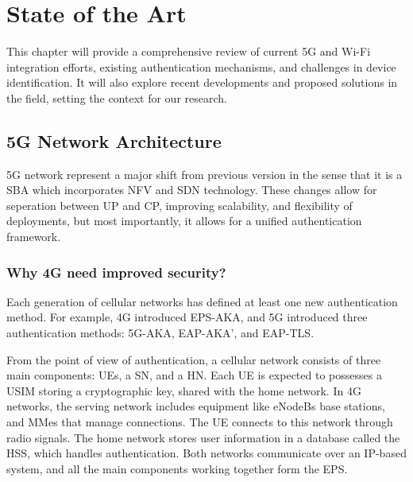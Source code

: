 \chapter{State of the Art}%
\label{chapter:State of the Art}

\begin{introduction}
This chapter will provide a comprehensive review of current \ac{5G} and Wi-Fi integration efforts, existing authentication mechanisms, and challenges in device identification. It will also explore recent developments and proposed solutions in the field, setting the context for our research.
\end{introduction}

\section{\acs{5G} Network Architecture}

\ac{5G} network represent a major shift from previous version in the sense that it is a \ac{SBA} which incorporates \ac{NFV} and \ac{SDN} technology. These changes allow for seperation between \ac{UP} and \ac{CP}, improving scalability, and flexibility of deployments, but most importantly, it allows for a unified authentication framework.~\cite{23.501-p56}

\subsection{Why \ac{4G} need improved security?}

Each generation of cellular networks has defined at least one new authentication method. For example, \ac{4G} introduced EPS-AKA, and 5G introduced three authentication methods: \ac{5G-AKA}, \ac{EAP-AKA’}, and \ac{EAP-TLS}.

From the point of view of authentication, a cellular network consists of three main components: \acp{UE}, a \ac{SN}, and a \ac{HN}. Each \ac{UE} is expected to possesses a \ac{USIM} storing a cryptographic key, shared with the home network. In 4G networks, the serving network includes equipment like \acp{eNodeB} base stations, and  \acp{MMe} that manage connections. The \ac{UE} connects to this network through radio signals. The home network stores user information in a database called the \ac{HSS}, which handles authentication. Both networks communicate over an IP-based system, and all the main components working together form the \ac{EPS}.~\cite{cbl-comp-4g-5g-p3}

